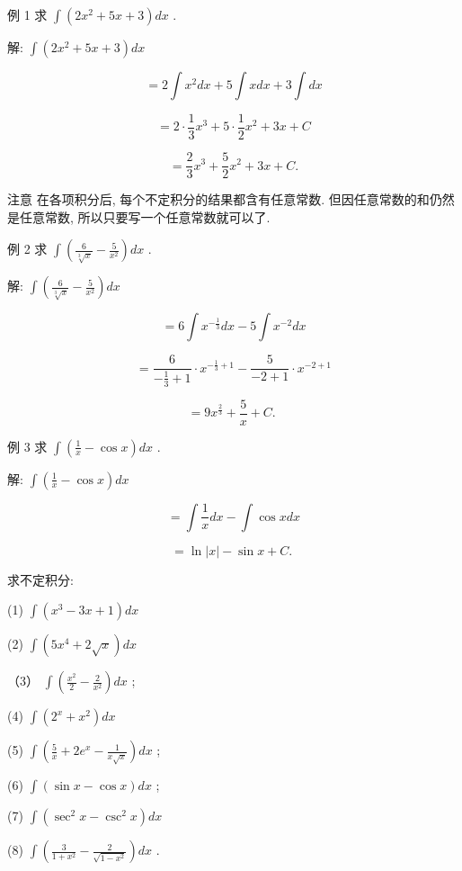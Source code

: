 \documentclass[lang=cn,newtx,10pt,scheme=chinese]{elegantbook}
\begin{document}
例 1 求 \(\int \left( {2{x}^{2} + {5x} + 3}\right) {dx}\) .

解: \(\int \left( {2{x}^{2} + {5x} + 3}\right) {dx}\)

\[
= 2\int {x}^{2}{dx} + 5\int {xdx} + 3\int {dx}
\]

\[
= 2 \cdot \frac{1}{3}{x}^{3} + 5 \cdot \frac{1}{2}{x}^{2} + {3x} + C
\]

\[
= \frac{2}{3}{x}^{3} + \frac{5}{2}{x}^{2} + {3x} + C.
\]

注意 在各项积分后, 每个不定积分的结果都含有任意常数. 但因任意常数的和仍然是任意常数, 所以只要写一个任意常数就可以了.

例 2 求 \(\int \left( {\frac{6}{\sqrt[3]{x}} - \frac{5}{{x}^{2}}}\right) {dx}\) .

解: \(\int \left( {\frac{6}{\sqrt[3]{x}} - \frac{5}{{x}^{2}}}\right) {dx}\)

\[
= 6\int {x}^{-\frac{1}{3}}{dx} - 5\int {x}^{-2}{dx}
\]

\[
= \frac{6}{-\frac{1}{3} + 1} \cdot {x}^{-\frac{1}{3} + 1} - \frac{5}{-2 + 1} \cdot {x}^{-2 + 1}
\]

\[
= 9{x}^{\frac{2}{3}} + \frac{5}{x} + C\text{. }
\]

例 3 求 \(\int \left( {\frac{1}{x} - \cos x}\right) {dx}\) .

解: \(\int \left( {\frac{1}{x} - \cos x}\right) {dx}\)

\[
= \int \frac{1}{x}{dx} - \int \cos {xdx}
\]

\[
= \ln \left| x\right| - \sin x + C\text{. }
\]

\begin{problemset}[练习]

\item 求不定积分:

(1) \(\int \left( {{x}^{3} - {3x} + 1}\right) {dx}\)

(2) \(\int \left( {5{x}^{4} + 2\sqrt{x}}\right) {dx}\)

（3） \(\int \left( {\frac{{x}^{2}}{2} - \frac{2}{{x}^{2}}}\right) {dx}\) ;

(4) \(\int \left( {{2}^{x} + {x}^{2}}\right) {dx}\)

(5) \(\int \left( {\frac{5}{x} + 2{e}^{x} - \frac{1}{x\sqrt{x}}}\right) {dx}\) ;

(6) \(\int \left( {\sin x - \cos x}\right) {dx}\) ;

(7) \(\int \left( {{\sec }^{2}x - {\csc }^{2}x}\right) {dx}\)

(8) \(\int \left( {\frac{3}{1 + {x}^{2}} - \frac{2}{\sqrt{1 - {x}^{2}}}}\right) {dx}\) .

\end{problemset}
\end{document}
